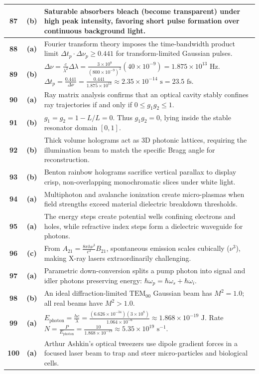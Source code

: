 {\begin{tabularx}{\textwidth}{|c|c|X|}
\textbf{87} & \textbf{(b)} & Saturable absorbers bleach (become transparent) under high peak intensity, favoring short pulse formation over continuous background light. \\ \hline
\textbf{88} & \textbf{(a)} & Fourier transform theory imposes the time-bandwidth product limit $\Delta t_p \cdot \Delta\nu_p \ge 0.441$ for transform-limited Gaussian pulses. \\ \hline
\textbf{89} & \textbf{(b)} & $\Delta\nu = \frac{c}{\lambda^2}\Delta\lambda = \frac{3 \times 10^8}{(800 \times 10^{-9})^2}(40 \times 10^{-9}) = 1.875 \times 10^{13}\text{ Hz}$. $\Delta t_p = \frac{0.441}{\Delta\nu} = \frac{0.441}{1.875 \times 10^{13}} \approx 2.35 \times 10^{-14}\text{ s} = 23.5\text{ fs}$. \\ \hline
\textbf{90} & \textbf{(a)} & Ray matrix analysis confirms that an optical cavity stably confines ray trajectories if and only if $0 \le g_1 g_2 \le 1$. \\ \hline
\textbf{91} & \textbf{(b)} & $g_1 = g_2 = 1 - L/L = 0$. Thus $g_1 g_2 = 0$, lying inside the stable resonator domain $[0, 1]$. \\ \hline
\textbf{92} & \textbf{(b)} & Thick volume holograms act as 3D photonic lattices, requiring the illumination beam to match the specific Bragg angle for reconstruction. \\ \hline
\textbf{93} & \textbf{(b)} & Benton rainbow holograms sacrifice vertical parallax to display crisp, non-overlapping monochromatic slices under white light. \\ \hline
\textbf{94} & \textbf{(a)} & Multiphoton and avalanche ionization create micro-plasmas when field strengths exceed material dielectric breakdown thresholds. \\ \hline
\textbf{95} & \textbf{(a)} & The energy steps create potential wells confining electrons and holes, while refractive index steps form a dielectric waveguide for photons. \\ \hline
\textbf{96} & \textbf{(c)} & From $A_{21} = \frac{8\pi h \nu^3}{c^3} B_{21}$, spontaneous emission scales cubically ($\nu^3$), making X-ray lasers extraordinarily challenging. \\ \hline
\textbf{97} & \textbf{(a)} & Parametric down-conversion splits a pump photon into signal and idler photons preserving energy: $\hbar\omega_p = \hbar\omega_s + \hbar\omega_i$. \\ \hline
\textbf{98} & \textbf{(b)} & An ideal diffraction-limited $\text{TEM}_{00}$ Gaussian beam has $M^2 = 1.0$; all real beams have $M^2 > 1.0$. \\ \hline
\textbf{99} & \textbf{(a)} & $E_{\text{photon}} = \frac{hc}{\lambda} = \frac{(6.626 \times 10^{-34})(3 \times 10^8)}{1.064 \times 10^{-6}} \approx 1.868 \times 10^{-19}\text{ J}$. Rate $N = \frac{P}{E_{\text{photon}}} = \frac{10}{1.868 \times 10^{-19}} \approx 5.35 \times 10^{19}\text{ s}^{-1}$. \\ \hline
\textbf{100} & \textbf{(a)} & Arthur Ashkin's optical tweezers use dipole gradient forces in a focused laser beam to trap and steer micro-particles and biological cells. \\ \hline
\end{tabularx}
}


